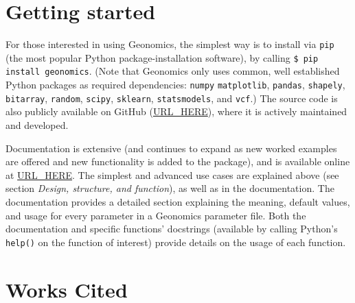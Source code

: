 ﻿\documentclass{article}
\begin{document}
\section{Getting started}
For those interested in using Geonomics, the simplest way is to install
via \texttt{pip} (the most popular Python package-installation software),
by calling \texttt{\$ pip install geonomics}.
(Note that Geonomics only uses common, well established Python packages
as required dependencies: \texttt{numpy} \texttt{matplotlib},
\texttt{pandas}, \texttt{shapely}, \texttt{bitarray}, \texttt{random},
\texttt{scipy}, \texttt{sklearn}, \texttt{statsmodels}, and \texttt{vcf}.)
The source code is also publicly available on GitHub (\url{URL_HERE}),
where it is actively maintained and developed.

Documentation is extensive (and continues to expand as new worked examples
are offered and new functionality is added to the package), and is available
online at \url{URL_HERE}.  
The simplest and advanced use cases are explained above (see section
\emph{Design, structure, and function}), as well as in the documentation.
The documentation provides a detailed section explaining the meaning,
default values, and usage for every parameter in a Geonomics parameter
file.
Both the documentation and specific functions' docstrings (available
by calling Python's \texttt{help()} on the function of interest) provide
details on the usage of each function.

\section{Works Cited}
\end{document}
